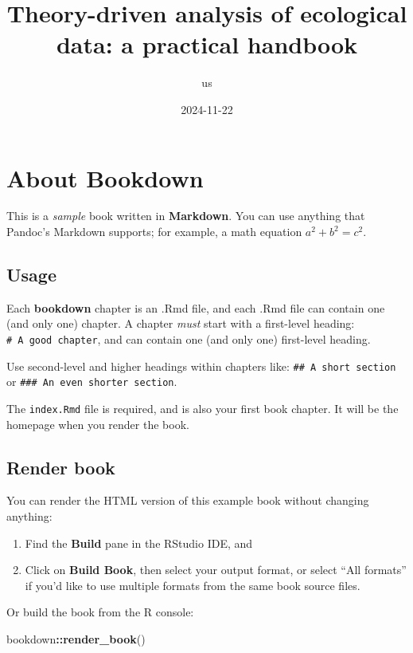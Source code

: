 \documentclass[
]{book}
\title{Theory-driven analysis of ecological data: a practical handbook}
\author{us}
\date{2024-11-22}
\newenvironment{Shaded}{\begin{snugshade}}{\end{snugshade}}
\newcommand{\FunctionTok}[1]{\textcolor[rgb]{0.13,0.29,0.53}{\textbf{#1}}}
\newcommand{\NormalTok}[1]{#1}
\newcommand{\SpecialCharTok}[1]{\textcolor[rgb]{0.81,0.36,0.00}{\textbf{#1}}}
\theoremstyle{definition}
\theoremstyle{definition}
\theoremstyle{definition}
\theoremstyle{definition}
\theoremstyle{remark}
\begin{document}
\maketitle

{
\setcounter{tocdepth}{1}
\tableofcontents
}
\chapter{About Bookdown}\label{about-bookdown}

This is a \emph{sample} book written in \textbf{Markdown}. You can use anything that Pandoc's Markdown supports; for example, a math equation \(a^2 + b^2 = c^2\).

\section{Usage}\label{usage}

Each \textbf{bookdown} chapter is an .Rmd file, and each .Rmd file can contain one (and only one) chapter. A chapter \emph{must} start with a first-level heading: \texttt{\#\ A\ good\ chapter}, and can contain one (and only one) first-level heading.

Use second-level and higher headings within chapters like: \texttt{\#\#\ A\ short\ section} or \texttt{\#\#\#\ An\ even\ shorter\ section}.

The \texttt{index.Rmd} file is required, and is also your first book chapter. It will be the homepage when you render the book.

\section{Render book}\label{render-book}

You can render the HTML version of this example book without changing anything:

\begin{enumerate}
\def\labelenumi{\arabic{enumi}.}
\item
  Find the \textbf{Build} pane in the RStudio IDE, and
\item
  Click on \textbf{Build Book}, then select your output format, or select ``All formats'' if you'd like to use multiple formats from the same book source files.
\end{enumerate}

Or build the book from the R console:

\begin{Shaded}
\begin{Highlighting}[]
\NormalTok{bookdown}\SpecialCharTok{::}\FunctionTok{render\_book}\NormalTok{()}
\end{Highlighting}
\end{Shaded}
\end{document}
